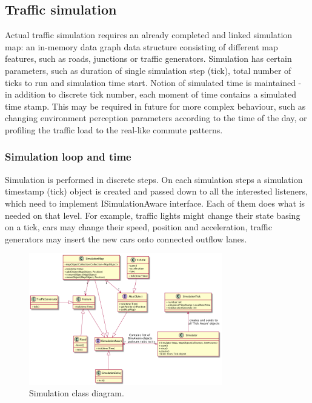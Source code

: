 \subsection{Traffic simulation}
Actual traffic simulation requires an already completed and linked simulation map: an in-memory data graph data structure consisting of different map features, such as roads, junctions or traffic generators. Simulation has certain parameters, such as duration of single simulation step (tick), total number of ticks to run and simulation time start. Notion of simulated time is maintained - in addition to discrete tick number, each moment of time contains a simulated time stamp. This may be required in future for more complex behaviour, such as changing environment perception parameters according to the time of the day, or profiling the traffic load to the real-like commute patterns.

\subsubsection{Simulation loop and time}
Simulation is performed in discrete steps. On each simulation steps a simulation timestamp (tick) object is created and passed down to all the interested listeners, which need to implement ISimulationAware interface. Each of them does what is needed on that level. For example, traffic lights might change their state basing on a tick, cars may change their speed, position and acceleration, traffic generators may insert the new cars onto connected outflow lanes.

\begin{figure}[h]
    \vspace{1.5em}
    \caption{Simulation class diagram.}
    \label{fig:simulationClassDiagram}
    \centering
    \includegraphics[width=0.75\textwidth]{../../uml_diagrams/simulatorClassDiagram.png}
    \vspace{1.5em}
\end{figure}

